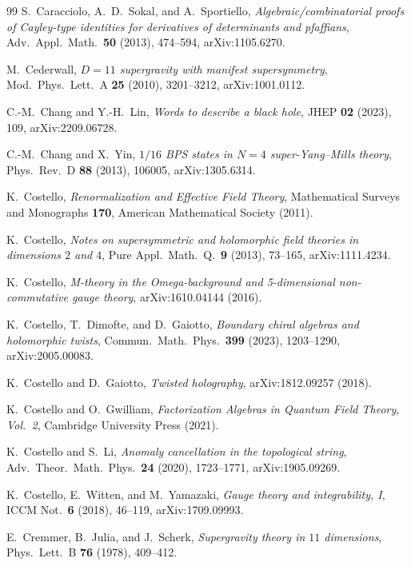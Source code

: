 \documentclass[11pt,a4paper]{article}
\theoremstyle{plain}
\theoremstyle{definition}
\theoremstyle{remark}
\numberwithin{equation}{section}
\numberwithin{figure}{section}
\numberwithin{table}{section}
\def\mathcal#1{#1}%
\begin{document}
\begin{thebibliography}{99}
S.~Caracciolo, A.~D.~Sokal, and A.~Sportiello,
\emph{Algebraic/combinatorial proofs of Cayley-type identities for derivatives of determinants and pfaffians},
Adv.\ Appl.\ Math.\ \textbf{50} (2013), 474--594, arXiv:1105.6270.

M.~Cederwall,
\emph{$D=11$ supergravity with manifest supersymmetry},
Mod.\ Phys.\ Lett.\ A \textbf{25} (2010), 3201--3212, arXiv:1001.0112.

C.-M.~Chang and Y.-H.~Lin,
\emph{Words to describe a black hole},
JHEP \textbf{02} (2023), 109, arXiv:2209.06728.

C.-M.~Chang and X.~Yin,
\emph{$1/16$ BPS states in $\mathcal{N}=4$ super-Yang--Mills theory},
Phys.\ Rev.\ D \textbf{88} (2013), 106005, arXiv:1305.6314.

K.~Costello,
\emph{Renormalization and Effective Field Theory},
Mathematical Surveys and Monographs \textbf{170}, American Mathematical Society (2011).

K.~Costello,
\emph{Notes on supersymmetric and holomorphic field theories in dimensions $2$ and $4$},
Pure Appl.\ Math.\ Q.\ \textbf{9} (2013), 73--165, arXiv:1111.4234.

K.~Costello,
\emph{M-theory in the Omega-background and 5-dimensional non-commutative gauge theory},
arXiv:1610.04144 (2016).

K.~Costello, T.~Dimofte, and D.~Gaiotto,
\emph{Boundary chiral algebras and holomorphic twists},
Commun.\ Math.\ Phys.\ \textbf{399} (2023), 1203--1290, arXiv:2005.00083.

K.~Costello and D.~Gaiotto,
\emph{Twisted holography},
arXiv:1812.09257 (2018).

K.~Costello and O.~Gwilliam,
\emph{Factorization Algebras in Quantum Field Theory, Vol.~2},
Cambridge University Press (2021).

K.~Costello and S.~Li,
\emph{Anomaly cancellation in the topological string},
Adv.\ Theor.\ Math.\ Phys.\ \textbf{24} (2020), 1723--1771, arXiv:1905.09269.

K.~Costello, E.~Witten, and M.~Yamazaki,
\emph{Gauge theory and integrability, I},
ICCM Not.\ \textbf{6} (2018), 46--119, arXiv:1709.09993.

E.~Cremmer, B.~Julia, and J.~Scherk,
\emph{Supergravity theory in $11$ dimensions},
Phys.\ Lett.\ B \textbf{76} (1978), 409--412.


\end{thebibliography}
\end{document}
